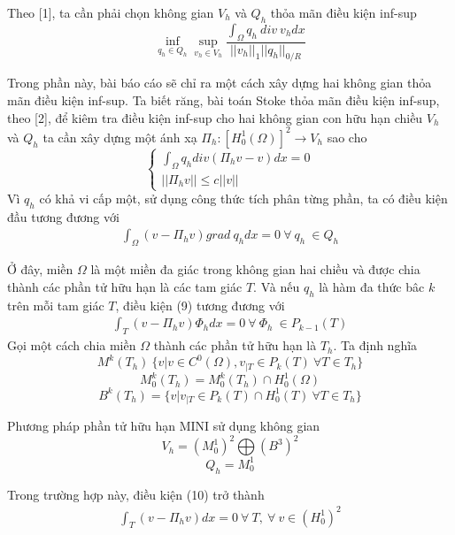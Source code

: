 \documentclass[14pt]{extreport}
\begin{document}
{Theo [1], ta cần phải chọn không gian $V_h$ và $Q_h$ thỏa mãn điều kiện inf-sup
$$\inf_{q_h \in Q_h} \sup_{v_h \in V_h} \frac{\int_{\Omega} q_h \ div \ v_h dx}{||v_h||_{1} ||q_h||_{0/R}}$$

Trong phần này, bài báo cáo sẽ chỉ ra một cách xây dựng hai không gian thỏa mãn điều kiện inf-sup. Ta biết răng, bài toán Stoke thỏa mãn điều kiện inf-sup, theo [2], để kiêm tra điều kiện inf-sup cho hai không gian con hữu hạn chiều $V_h$ và $Q_h$ ta cần xây dựng một ánh xạ $\Pi_h : [H_0^1 (\Omega)]^2 \rightarrow V_h$ sao cho
$$
\begin{cases}
\int_{\Omega} q_h div(\Pi_hv - v) dx = 0 \\
||\Pi_hv|| \leq c ||v||
\end{cases}
$$
Vì $q_h$ có khả vi cấp một, sử dụng công thức tích phân từng phần, ta có điều kiện đầu tương đương với
\begin{equation} \label{eq9}
\begin{split}
\int_{\Omega} (v - \Pi_hv) grad \ q_h dx = 0 \ \forall \ q_h \ \in Q_h
\end{split}
\end{equation}

Ở đây, miền $\Omega$ là một miền đa giác trong không gian hai chiều và được chia thành các phần tử hữu hạn là các tam giác $T$. Và nếu $q_h$ là hàm đa thức bâc $k$ trên mỗi tam giác $T$, điều kiện (9) tương đương với
\begin{equation} \label{eq10}
\begin{split}
\int_{T} (v - \Pi_hv) \Phi_h dx = 0 \ \forall \ \Phi_h \ \in P_{k-1}(T)
\end{split}
\end{equation}
Gọi một cách chia miền $\Omega$ thành các phần tử hữu hạn là $T_h$. Ta định nghĩa
$$M^k(T_h) \ \{ v| v\in C^0(\Omega), v_{|T} \in P_k(T) \ \forall T \in T_h \}$$
$$M_0^k(T_h) = M_0^k(T_h) \cap H_0^1(\Omega)$$
$$B^k(T_h) = \{ v | v_{|T} \in P_k(T) \cap H_0^1(T) \ \forall T \in T_h \}$$

Phương pháp phần tử hữu hạn MINI sử dụng không gian
$$V_h = (M_0^1)^2 \bigoplus (B^3)^2$$
$$Q_h = M_0^1$$

Trong trường hợp này, điều kiện (10) trở thành
\begin{equation} \label{eq11}
\begin{split}
\int_T (v - \Pi_hv) dx = 0 \ \forall \ T, \ \forall \ v \in (H_0^1)^2
\end{split}
\end{equation}

}
\end{document}
